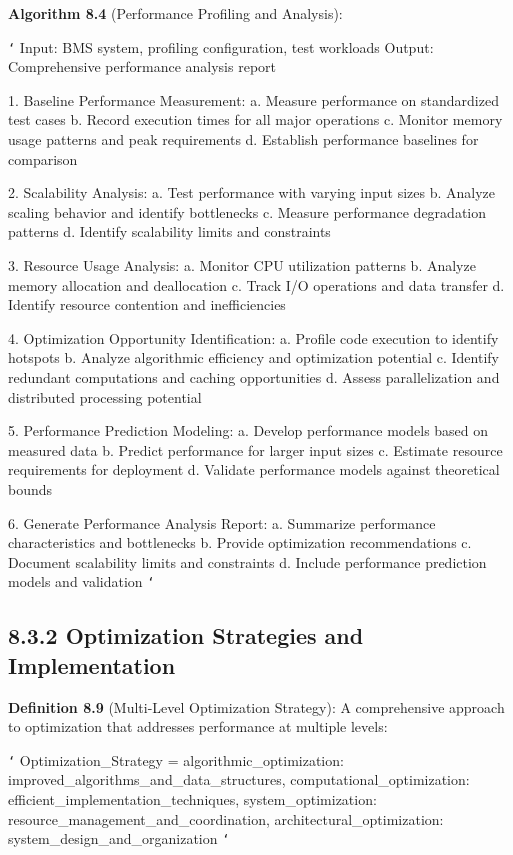 \textbf{Algorithm 8.4} (Performance Profiling and Analysis):

\texttt{`}
Input: BMS system, profiling configuration, test workloads
Output: Comprehensive performance analysis report

1. Baseline Performance Measurement:
   a. Measure performance on standardized test cases
   b. Record execution times for all major operations
   c. Monitor memory usage patterns and peak requirements
   d. Establish performance baselines for comparison
   
2. Scalability Analysis:
   a. Test performance with varying input sizes
   b. Analyze scaling behavior and identify bottlenecks
   c. Measure performance degradation patterns
   d. Identify scalability limits and constraints
   
3. Resource Usage Analysis:
   a. Monitor CPU utilization patterns
   b. Analyze memory allocation and deallocation
   c. Track I/O operations and data transfer
   d. Identify resource contention and inefficiencies
   
4. Optimization Opportunity Identification:
   a. Profile code execution to identify hotspots
   b. Analyze algorithmic efficiency and optimization potential
   c. Identify redundant computations and caching opportunities
   d. Assess parallelization and distributed processing potential
   
5. Performance Prediction Modeling:
   a. Develop performance models based on measured data
   b. Predict performance for larger input sizes
   c. Estimate resource requirements for deployment
   d. Validate performance models against theoretical bounds
   
6. Generate Performance Analysis Report:
   a. Summarize performance characteristics and bottlenecks
   b. Provide optimization recommendations
   c. Document scalability limits and constraints
   d. Include performance prediction models and validation
\texttt{`}

\subsection{8.3.2 Optimization Strategies and Implementation}

\textbf{Definition 8.9} (Multi-Level Optimization Strategy): A comprehensive approach to optimization that addresses performance at multiple levels:

\texttt{`}
Optimization_Strategy = {
    algorithmic_optimization: improved_algorithms_and_data_structures,
    computational_optimization: efficient_implementation_techniques,
    system_optimization: resource_management_and_coordination,
    architectural_optimization: system_design_and_organization
}
\texttt{`}

